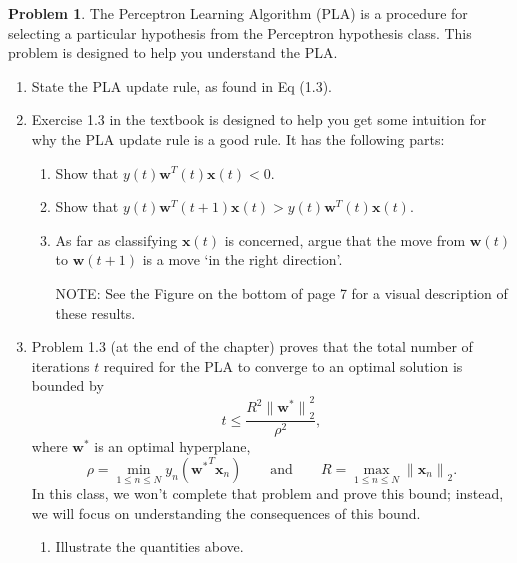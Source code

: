 \documentclass[10pt]{article}
\theoremstyle{definition}
\newtheorem{problem}{Problem}
\newcommand{\trans}[1]{{#1}^{T}}
\newcommand{\w}{\mathbf w}
\newcommand{\wstar}{{\w}^{*}}
\newcommand{\x}{\mathbf x}
\newcommand{\ltwo}[1]{{\lVert {#1} \rVert}_2}
\begin{document}
\newpage
\begin{problem}
    The Perceptron Learning Algorithm (PLA) is a procedure for selecting a particular hypothesis from the Perceptron hypothesis class.
    This problem is designed to help you understand the PLA.
    \begin{enumerate}
        \item State the PLA update rule, as found in Eq (1.3).
            \vspace{4in}
        \item Exercise 1.3 in the textbook is designed to help you get some intuition for why the PLA update rule is a good rule.
            It has the following parts:
            \begin{enumerate}
                \item Show that $y(t)\trans\w(t)\x(t) < 0$.
                    \vspace{4in}
                \item Show that $y(t)\trans\w(t+1)\x(t) > y(t)\trans\w(t)\x(t)$.
                    \vspace{4in}
                \item As far as classifying $\x(t)$ is concerned, argue that the move from $\w(t)$ to $\w(t+1)$ is a move `in the right direction'.

                    NOTE: See the Figure on the bottom of page 7 for a visual description of these results.
                    \vspace{4in}
            \end{enumerate}
            \newpage
        \item 
            Problem 1.3 (at the end of the chapter) proves that the total number of iterations $t$ required for the PLA to converge to an optimal solution is bounded by
            \begin{equation}
                t \le \frac{R^2 \ltwo{\wstar}^2}{\rho^2},
            \end{equation}
            where $\wstar$ is an optimal hyperplane,
    \begin{equation}
        \rho = \min_{1\le n\le N} y_n(\trans\wstar\x_n)
            \qquad\text{and}\qquad
        R = \max_{1\le n\le N} \ltwo{\x_n}.
    \end{equation}
            In this class, we won't complete that problem and prove this bound;
            instead, we will focus on understanding the consequences of this bound.
            \begin{enumerate}
                \item
                    Illustrate the quantities above.


\end{enumerate}
\end{enumerate}
\end{problem}
\end{document}
